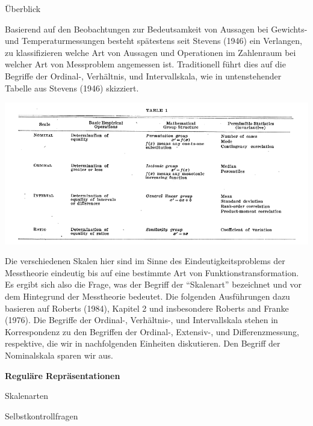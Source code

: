 \documentclass[
  8pt,
  ignorenonframetext,
]{beamer}
\begin{document}
\begin{frame}{}
\protect\hypertarget{section-2}{}

Überblick \footnotesize

Basierend auf den Beobachtungen zur Bedeutsamkeit von Aussagen bei
Gewichts- und Temperaturmessungen besteht spätestens seit Stevens (1946)
ein Verlangen, zu klassifizieren welche Art von Aussagen und Operationen
im Zahlenraum bei welcher Art von Messproblem angemessen ist.
Traditionell führt dies auf die Begriffe der Ordinal-, Verhältnis, und
Intervallskala, wie in untenstehender Tabelle aus Stevens (1946)
skizziert.

\begin{center}\includegraphics[width=0.7\linewidth]{7_Abbildungen/pfm_7_skalenarten} \end{center}

Die verschiedenen Skalen hier sind im Sinne des Eindeutigkeitsproblems
der Messtheorie eindeutig bis auf eine bestimmte Art von
Funktionstransformation. Es ergibt sich also die Frage, was der Begriff
der ``Skalenart'' bezeichnet und vor dem Hintegrund der Messtheorie
bedeutet. Die folgenden Ausführungen dazu basieren auf Roberts (1984),
Kapitel 2 und insbesondere Roberts and Franke (1976). Die Begriffe der
Ordinal-, Verhältnis-, und Intervallskala stehen in Korrespondenz zu den
Begriffen der Ordinal-, Extensiv-, und Differenzmessung, respektive, die
wir in nachfolgenden Einheiten diskutieren. Den Begriff der Nominalskala
sparen wir aus.
\end{frame}

\begin{frame}{}
\protect\hypertarget{section-3}{}
\vfill
\Large
{}

\textbf{Reguläre Repräsentationen}

Skalenarten

Selbstkontrollfragen

\vfill
\end{frame}
\end{document}
